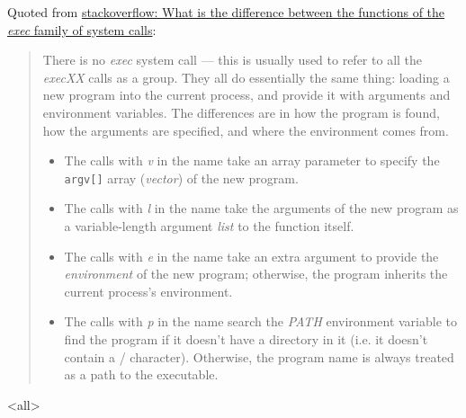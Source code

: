 Quoted from
\href{https://stackoverflow.com/questions/20823371/what-is-the-difference-between-the-functions-of-the-exec-family-of-system-calls}{
  stackoverflow: What is the difference between the functions of the \emph{exec} family of system calls}:

\begin{quote}
  There is no \emph{exec} system call --- this is usually used to refer to all the
  \emph{execXX} calls as a group. They all do essentially the same thing: loading a new
  program into the current process, and provide it with arguments and environment
  variables. The differences are in how the program is found, how the arguments are
  specified, and where the environment comes from.

  \begin{itemize}
  \item The calls with \emph{v} in the name take an array parameter to specify the
    \texttt{argv[]} array (\emph{vector}) of the new program.
  \item The calls with \emph{l} in the name take the arguments of the new program as a
    variable-length argument \emph{list} to the function itself.
  \item The calls with \emph{e} in the name take an extra argument to provide the
    \emph{environment} of the new program; otherwise, the program inherits the current
    process's environment.
  \item The calls with \emph{p} in the name search the \emph{PATH} environment variable to
    find the program if it doesn't have a directory in it (i.e. it doesn't contain a /
    character). Otherwise, the program name is always treated as a path to the executable.
  \end{itemize}
\end{quote}

\mode<all>

